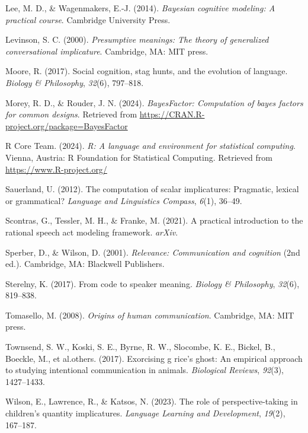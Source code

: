 \documentclass[
  man,floatsintext]{apa6}
\newlength{\cslhangindent}
\newlength{\cslentryspacingunit} %
\newenvironment{CSLReferences}[2] %
 {%
  \setlength{\parindent}{0pt}
  \ifodd #1
  \let\oldpar\par
  \def\par{\hangindent=\cslhangindent\oldpar}
  \fi
  \setlength{\parskip}{#2\cslentryspacingunit}
 }%
 {}
\begin{document}
\begin{CSLReferences}{1}{0}
\leavevmode{}%
Lee, M. D., \& Wagenmakers, E.-J. (2014). \emph{Bayesian cognitive modeling: A practical course}. Cambridge University Press.

\leavevmode{}%
Levinson, S. C. (2000). \emph{Presumptive meanings: The theory of generalized conversational implicature}. Cambridge, MA: MIT press.

\leavevmode{}%
Moore, R. (2017). Social cognition, stag hunts, and the evolution of language. \emph{Biology \& Philosophy}, \emph{32}(6), 797--818.

\leavevmode{}%
Morey, R. D., \& Rouder, J. N. (2024). \emph{BayesFactor: Computation of bayes factors for common designs}. Retrieved from \url{https://CRAN.R-project.org/package=BayesFactor}

\leavevmode{}%
R Core Team. (2024). \emph{R: A language and environment for statistical computing}. Vienna, Austria: R Foundation for Statistical Computing. Retrieved from \url{https://www.R-project.org/}

\leavevmode{}%
Sauerland, U. (2012). The computation of scalar implicatures: Pragmatic, lexical or grammatical? \emph{Language and Linguistics Compass}, \emph{6}(1), 36--49.

\leavevmode{}%
Scontras, G., Tessler, M. H., \& Franke, M. (2021). A practical introduction to the rational speech act modeling framework. \emph{arXiv}.

\leavevmode{}%
Sperber, D., \& Wilson, D. (2001). \emph{Relevance: Communication and cognition} (2nd ed.). Cambridge, MA: Blackwell Publishers.

\leavevmode{}%
Sterelny, K. (2017). From code to speaker meaning. \emph{Biology \& Philosophy}, \emph{32}(6), 819--838.

\leavevmode{}%
Tomasello, M. (2008). \emph{Origins of human communication}. Cambridge, MA: MIT press.

\leavevmode{}%
Townsend, S. W., Koski, S. E., Byrne, R. W., Slocombe, K. E., Bickel, B., Boeckle, M., et al.others. (2017). Exorcising g rice's ghost: An empirical approach to studying intentional communication in animals. \emph{Biological Reviews}, \emph{92}(3), 1427--1433.

\leavevmode{}%
Wilson, E., Lawrence, R., \& Katsos, N. (2023). The role of perspective-taking in children's quantity implicatures. \emph{Language Learning and Development}, \emph{19}(2), 167--187.

\end{CSLReferences}
\end{document}
